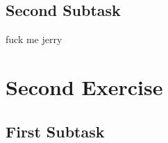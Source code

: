 \documentclass[a4paper]{article}
\begin{document}
\subsection{Second Subtask}
fuck me jerry

\bigskip


\section{Second Exercise}
\blindtext
\subsection{First Subtask}

\bigskip

\end{document}
